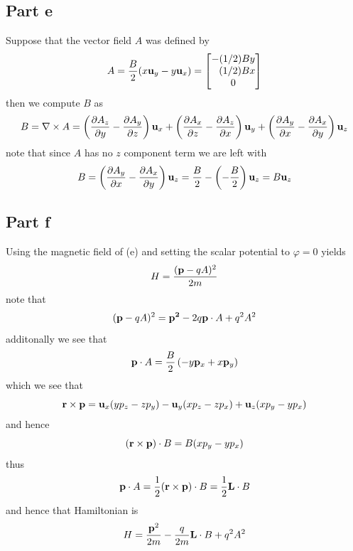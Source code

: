 \documentclass[12pt]{report}
\newcommand{\rb}{\bold{r}}
\begin{document}
\subsection*{Part e}
Suppose that the vector field $A$ was defined by
\begin{equation*}
    A = \frac{B}{2}(x \bold{u}_y - y\bold{u}_x) = \begin{bmatrix}
        -(1/2)By \\ \phantom{-}(1/2)Bx \\
        0
    \end{bmatrix}
\end{equation*}
then we compute $B$ as
\begin{equation*}
    B = \nabla \times A = \left(\frac{\partial A_z}{\partial y} - \frac{\partial A_y}{\partial z}\right)\bold{u}_x + \left(\frac{\partial A_x}{\partial z} - \frac{\partial A_z}{\partial x}\right)\bold{u}_y + \left(\frac{\partial A_y}{\partial x} - \frac{\partial A_x}{\partial y}\right)\bold{u}_z
\end{equation*}
note that since $A$ has no $z$ component term we are left with
\begin{equation*}
    B = \left(\frac{\partial A_y}{\partial x} - \frac{\partial A_x}{\partial y}\right)\bold{u}_z = \frac{B}{2} - \left(-\frac{B}{2}\right) \bold{u}_z = B \bold{u}_z
\end{equation*}

\subsection*{Part f}
Using the magnetic field of (e) and setting the scalar potential to $\varphi = 0$ yields
\begin{equation*}
    H = \frac{(\bold{p} - qA)^2}{2m}
\end{equation*}
note that
\begin{equation*}
    (\bold{p} - qA)^2 = \bold{p^2} - 2q\bold{p} \cdot A + q^2 A^2
\end{equation*}
additonally we see that
\begin{equation*}
    \bold{p} \cdot A = \frac{B}{2}\left(-y \bold{p}_x +x \bold{p}_y\right)
\end{equation*}
which we see that
\begin{equation*}
    \rb \times \bold{p} = \bold{u}_x(yp_z - zp_y) - \bold{u}_y(xp_z - zp_x) + \bold{u}_z(xp_y - yp_x)
\end{equation*}
and hence 
\begin{equation*}
    (\bold{r} \times \bold{p}) \cdot B = B(xp_y - yp_x)
\end{equation*}
thus 
\begin{equation*}
    \bold{p} \cdot A = \frac{1}{2}(\bold{r} \times \bold{p}) \cdot B = \frac{1}{2} \bold{L} \cdot B
\end{equation*}
and hence that Hamiltonian is
\begin{equation*}
    H = \frac{\bold{p}^2}{2m} - \frac{q}{2m} \bold{L} \cdot B + q^2 A^2
\end{equation*}
\end{document}
